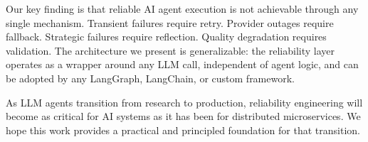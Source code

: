 \documentclass[conference]{IEEEtran}
\begin{document}
Our key finding is that reliable AI agent execution is not achievable through any single mechanism. Transient failures require retry. Provider outages require fallback. Strategic failures require reflection. Quality degradation requires validation. The architecture we present is generalizable: the reliability layer operates as a wrapper around any LLM call, independent of agent logic, and can be adopted by any LangGraph, LangChain, or custom framework.

As LLM agents transition from research to production, reliability engineering will become as critical for AI systems as it has been for distributed microservices. We hope this work provides a practical and principled foundation for that transition.

\balance
\end{document}
